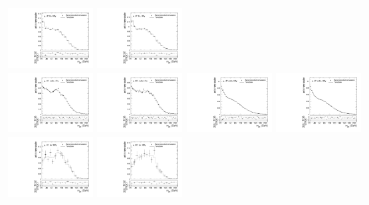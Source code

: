 \begin{figure}[htbp]
  \includegraphics[width=0.2\textwidth]{fig/2Dfit/templateVsReco_nonRes_r0_MJ_mu_LP_bb_HDy.pdf}
  \includegraphics[width=0.2\textwidth]{fig/2Dfit/templateVsReco_nonRes_r0_MJ_e_LP_bb_HDy.pdf}\\
  \includegraphics[width=0.2\textwidth]{fig/2Dfit/templateVsReco_nonRes_r0_MJ_mu_HP_nobb_HDy.pdf}
  \includegraphics[width=0.2\textwidth]{fig/2Dfit/templateVsReco_nonRes_r0_MJ_e_HP_nobb_HDy.pdf}
  \includegraphics[width=0.2\textwidth]{fig/2Dfit/templateVsReco_nonRes_r0_MJ_mu_LP_nobb_HDy.pdf}
  \includegraphics[width=0.2\textwidth]{fig/2Dfit/templateVsReco_nonRes_r0_MJ_e_LP_nobb_HDy.pdf}\\
  \includegraphics[width=0.2\textwidth]{fig/2Dfit/templateVsReco_nonRes_r0_MJ_mu_HP_vbf_HDy.pdf}
  \includegraphics[width=0.2\textwidth]{fig/2Dfit/templateVsReco_nonRes_r0_MJ_e_HP_vbf_HDy.pdf}

\end{figure}
